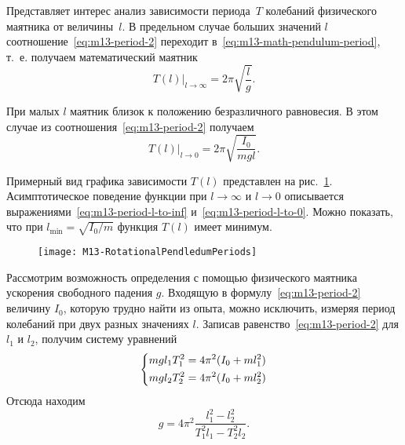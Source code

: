\documentclass[a4paper, 12pt]{extarticle}
\begin{document}
Представляет интерес анализ зависимости периода~$T$ колебаний физического маятника от величины~$l$. В предельном случае больших значений $l$ соотношение~\eqref{eq:m13-period-2} переходит в~\eqref{eq:m13-math-pendulum-period}, т.~е. получаем математический маятник
\begin{equation}
\label{eq:m13-period-l-to-inf}
\left. T(l) \right|_{l \to \infty} = 2 \pi \sqrt{\frac{l}{g}}. %
\end{equation}

При малых $l$ маятник близок к положению безразличного равновесия. В этом случае из соотношения~\eqref{eq:m13-period-2} получаем
\begin{equation}
\label{eq:m13-period-l-to-0}
\left. T(l) \right|_{l \to 0} = 2 \pi \sqrt{\frac{I_0}{mgl}}.
\end{equation}

Примерный вид графика зависимости $T(l)$ представлен на рис.~\ref{fig:m13-plot}. Асимптотическое поведение функции при $l \to \infty$ и $l \to 0$ описывается выражениями~\eqref{eq:m13-period-l-to-inf} и~\eqref{eq:m13-period-l-to-0}.  %
Можно показать, что при $l_{\min} = \sqrt{I_0 / m}$ функция $T(l)$ имеет минимум. %

\begin{figure}[h]
\begin{center}
\texttt{[image: M13-RotationalPendledumPeriods]}
\end{center}
\caption{\label{fig:m13-plot}}
\end{figure}

Рассмотрим возможность определения с помощью физического маятника ускорения свободного падения $g$. Входящую в формулу~\eqref{eq:m13-period-2} величину $I_0$, которую трудно найти из опыта, можно исключить, измеряя период колебаний при двух разных значениях $l$. Записав равенство~\eqref{eq:m13-period-2} для $l_1$ и $l_2$, получим систему уравнений %
\begin{equation}
\label{eq:m13-system}
\left\{ \aligned
m g l_1 T_1^2 = 4 \pi^2 (I_0 + m l_1^2) \\
m g l_2 T_2^2 = 4 \pi^2 (I_0 + m l_2^2)
\endaligned \right.
\end{equation}
Отсюда находим
\begin{equation}
\label{eq:m13-g-1}
g = 4 \pi^2 \frac{l_1^2 - l_2^2}{T_1^2 l_1 - T_2^2 l_2}.
\end{equation}
\end{document}

